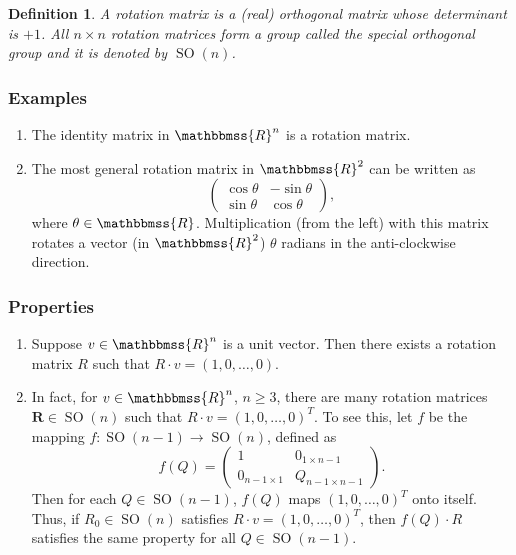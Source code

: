 \documentclass[12pt]{article}
\newcommand{\R}{\mathbbmss{R}}
\newtheorem{defn}{Definition}
\begin{document}
\begin{defn} A \emph{rotation matrix} is a 
    (real) orthogonal matrix whose determinant is $+1$. 
All $n\times n$ rotation matrices form a group called
    the \emph{specia{l} orthogona{l} grou{p}} and it is denoted by 
    $\operatorname{SO}(n)$. 
\end{defn}

\subsubsection*{Examples}
\begin{enumerate}
\item The identity matrix in $\R^n$ is a rotation matrix.
\item The most general rotation matrix in $\R^2$ can be written as 
$$
  \begin{pmatrix} 
       \cos \theta & -\sin \theta \\  
      \sin \theta & \cos \theta
  \end{pmatrix},
$$
where $\theta\in \R$. 
Multiplication (from the left) with this matrix 
rotates a vector (in $\R^2$) $\theta$ radians in the anti-clockwise
direction. 
\end{enumerate}

\subsubsection*{Properties}
\begin{enumerate}
\item Suppose $v\in \R^n$ is a unit vector. 
  Then there exists a rotation matrix $R$
  such that $R\cdot v = (1,0,\ldots, 0)$.
\item 
In fact, for $v\in \R^n$, $n\ge 3$, there are many rotation matrices 
$\mathbf{R} \in \operatorname{SO}(n)$ such that 
$R\cdot v = (1,0,\ldots, 0)^T$.
To see this, let $f$ be the mapping   
  $f\colon \operatorname{SO}(n-1)\rightarrow \operatorname{SO}(n)$,
  defined as
$$
 f(Q)=
 \begin{pmatrix}
 1 & 0_{1\times n-1}\\
 0_{n-1\times 1} & Q_{n-1\times n-1}
 \end{pmatrix}.
$$
Then for each $Q\in \operatorname{SO}(n-1)$, $f(Q)$ 
    maps $(1,0,\ldots, 0)^T$ onto itself. Thus, if 
    $R_0 \in \operatorname{SO}(n)$ satisfies $R\cdot v=(1,0,\ldots, 0)^T$, 
    then $f(Q)\cdot R$ satisfies the same property for all 
    $Q\in \operatorname{SO}(n-1)$. 
\end{enumerate}
\end{document}
